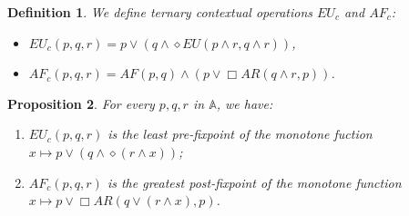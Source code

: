 \documentclass[11pt]{article}
\newcommand{\A}{{\mathbb A}}
\newtheorem{definition}{Definition}[section]
\newtheorem{proposition}[definition]{Proposition}
\begin{document}
\begin{definition}\label{contextual_op}
    We define ternary \emph{contextual operations} $EU_c$ and $AF_c$:
    \begin{itemize}
        \item $EU_c(p,q,r)=p\vee(q\wedge\diamond EU(p\wedge r,q\wedge r))$,
        \item $AF_c(p,q,r)=AF(p,q)\wedge(p\vee\Box AR(q\wedge r,p))$.
    \end{itemize}
\end{definition}

\begin{proposition}\label{contextual_as_fixpoints}
    For every $p,q,r$ in $\A$, we have:
    \begin{enumerate}
        \item $EU_c(p,q,r)$ is the least pre-fixpoint of the monotone fuction $x\mapsto p\vee(q\wedge \diamond(r\wedge x))$;
        \item $AF_c(p,q,r)$ is the greatest post-fixpoint of the monotone function $x\mapsto p\vee\Box AR(q\vee(r\wedge x),p)$.
    \end{enumerate}
    
\end{proposition}
\end{document}
